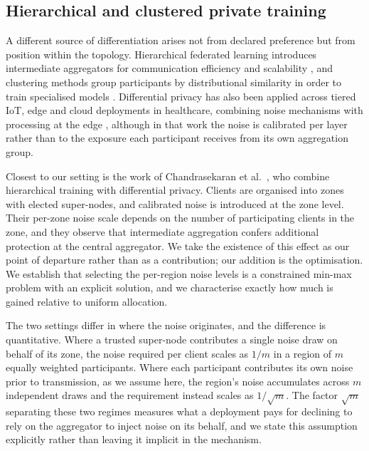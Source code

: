\documentclass[acmsmall,screen,review,anonymous]{acmart}
\theoremstyle{acmdefinition}%
\begin{document}
\subsection{Hierarchical and clustered private training}

A different source of differentiation arises not from declared preference but from
position within the topology. Hierarchical federated learning introduces
intermediate aggregators for communication efficiency and scalability
\cite{liu2020clientedgecloud, abad2020hierarchical}, and clustering methods group
participants by distributional similarity in order to train specialised models
\cite{briggs2020federated}. Differential privacy has also been applied across
tiered IoT, edge and cloud deployments in healthcare, combining noise mechanisms
with processing at the edge \cite{mangala2026dphealthcare}, although in that work
the noise is calibrated per layer rather than to the exposure each participant
receives from its own aggregation group.

Closest to our setting is the work of Chandrasekaran et
al.~\cite{chandrasekaran2022hfl}, who combine hierarchical training with
differential privacy. Clients are organised into zones with elected super-nodes,
and calibrated noise is introduced at the zone level. Their per-zone noise scale
depends on the number of participating clients in the zone, and they observe that
intermediate aggregation confers additional protection at the central aggregator.
We take the existence of this effect as our point of departure rather than as a
contribution; our addition is the optimisation. We establish that selecting the
per-region noise levels is a constrained min-max problem with an explicit solution,
and we characterise exactly how much is gained relative to uniform allocation.

The two settings differ in where the noise originates, and the difference is
quantitative. Where a trusted super-node contributes a single noise draw on behalf
of its zone, the noise required per client scales as $1/m$ in a region of $m$
equally weighted participants. Where each participant contributes its own noise
prior to transmission, as we assume here, the region's noise accumulates across $m$
independent draws and the requirement instead scales as $1/\sqrt{m}$. The factor
$\sqrt{m}$ separating these two regimes measures what a deployment pays for
declining to rely on the aggregator to inject noise on its behalf, and we state
this assumption explicitly rather than leaving it implicit in the mechanism.
\end{document}
